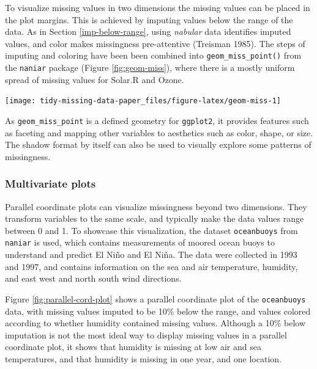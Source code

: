 \documentclass[]{article}
\let\origfigure\figure
\let\endorigfigure\endfigure
\renewenvironment{figure}[1][2] {
    \expandafter\origfigure\expandafter[H]
} {
    \endorigfigure
}
\theoremstyle{definition}
\theoremstyle{definition}
\theoremstyle{definition}
\theoremstyle{remark}
\begin{document}
To visualize missing values in two dimensions the missing values can be
placed in the plot margins. This is achieved by imputing values below
the range of the data. As in Section \ref{imp-below-range}, using
\emph{nabular} data identifies imputed values, and color makes
missingness pre-attentive (Treisman 1985). The steps of imputing and
coloring have been been combined into \texttt{geom\_miss\_point()} from
the \texttt{naniar} package (Figure \ref{fig:geom-miss}), where there is
a mostly uniform spread of missing values for Solar.R and Ozone.

\begin{figure}

{\centering \texttt{[image: tidy-missing-data-paper\_files/figure-latex/geom-miss-1]} 

}

\caption{Scatterplots with missings displayed at 10 percent below for the airquality dataset. Scatterplots of ozone and solar radiation (A), and ozone and temperature (B). There are missings in ozone and solar radiation, but not temperature.}\label{fig:geom-miss}
\end{figure}

As \texttt{geom\_miss\_point} is a defined geometry for
\texttt{ggplot2}, it provides features such as faceting and mapping
other variables to aesthetics such as color, shape, or size. The shadow
format by itself can also be used to visually explore some patterns of
missingness.

\hypertarget{multivariate-plots}{%
\subsubsection{Multivariate plots}\label{multivariate-plots}}

Parallel coordinate plots can visualize missingness beyond two
dimensions. They transform variables to the same scale, and typically
make the data values range between 0 and 1. To showcase this
visualization, the dataset \texttt{oceanbuoys} from \texttt{naniar} is
used, which contains measurements of moored ocean buoys to understand
and predict El Niño and El Niña. The data were collected in 1993 and
1997, and contains information on the sea and air temperature, humidity,
and east west and north south wind directions.

Figure \ref{fig:parallel-cord-plot} shows a parallel coordinate plot of
the \texttt{oceanbuoys} data, with missing values imputed to be 10\%
below the range, and values colored according to whether humidity
contained missing values. Although a 10\% below imputation is not the
most ideal way to display missing values in a parallel coordinate plot,
it shows that humidity is missing at low air and sea temperatures, and
that humidity is missing in one year, and one location.
\end{document}
